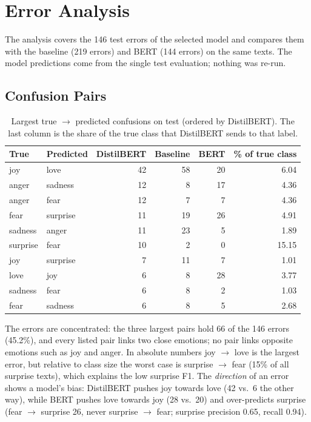 \documentclass[11pt,a4paper]{article}
\begin{document}
\section{Error Analysis}
\label{sec:errors}
The analysis covers the 146 test errors of the selected model and compares them with the baseline (219 errors) and BERT (144 errors) on the same texts. The model predictions come from the single test evaluation; nothing was re-run.

\subsection{Confusion Pairs}
\begin{table}[H]
\centering
\caption{Largest true $\rightarrow$ predicted confusions on test (ordered by DistilBERT). The last column is the share of the true class that DistilBERT sends to that label.}
\label{tab:pairs}
\begin{tabular}{@{}llrrrr@{}}
\toprule
\textbf{True} & \textbf{Predicted} & \textbf{DistilBERT} & \textbf{Baseline} & \textbf{BERT} & \textbf{\% of true class}\\
\midrule
joy & love & 42 & 58 & 20 & 6.04\\
anger & sadness & 12 & 8 & 17 & 4.36\\
anger & fear & 12 & 7 & 7 & 4.36\\
fear & surprise & 11 & 19 & 26 & 4.91\\
sadness & anger & 11 & 23 & 5 & 1.89\\
surprise & fear & 10 & 2 & 0 & 15.15\\
joy & surprise & 7 & 11 & 7 & 1.01\\
love & joy & 6 & 8 & 28 & 3.77\\
sadness & fear & 6 & 8 & 2 & 1.03\\
fear & sadness & 6 & 8 & 5 & 2.68\\
\bottomrule
\end{tabular}
\end{table}

The errors are concentrated: the three largest pairs hold 66 of the 146 errors (45.2\%), and every listed pair links two close emotions; no pair links opposite emotions such as joy and anger. In absolute numbers joy $\rightarrow$ love is the largest error, but relative to class size the worst case is surprise $\rightarrow$ fear (15\% of all surprise texts), which explains the low surprise F1. The \emph{direction} of an error shows a model's bias: DistilBERT pushes joy towards love (42 vs.\ 6 the other way), while BERT pushes love towards joy (28 vs.\ 20) and over-predicts surprise (fear $\rightarrow$ surprise 26, never surprise $\rightarrow$ fear; surprise precision 0.65, recall 0.94).
\end{document}
